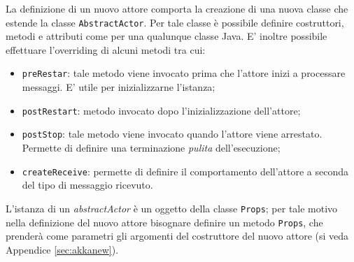 La definizione di un nuovo attore comporta la creazione di una nuova classe
che estende la classe \texttt{AbstractActor}.
Per tale classe è possibile definire costruttori, metodi e attributi come per una
qualunque classe Java. E' inoltre possibile  effettuare l'overriding di alcuni metodi 
tra cui:
\begin{itemize}
	\item \texttt{preRestar}: tale metodo viene invocato prima che l'attore inizi
	a processare messaggi. E' utile per inizializzarne l'istanza;
	\item \texttt{postRestart}: metodo invocato dopo l'inizializzazione dell'attore;
	\item \texttt{postStop}: tale metodo viene invocato quando l'attore viene arrestato.
	Permette di definire una terminazione \emph{pulita} dell'esecuzione;
	\item \texttt{createReceive}: permette di definire il comportamento dell'attore
	a seconda del tipo di messaggio ricevuto.
\end{itemize}
L'istanza di un \emph{abstractActor} è un oggetto della classe \texttt{Props}; per tale motivo
nella definizione del nuovo attore bisognare definire un metodo \texttt{Props}, che prenderà
come parametri gli argomenti del costruttore del nuovo attore (si veda Appendice \ref{sec:akkanew}).
